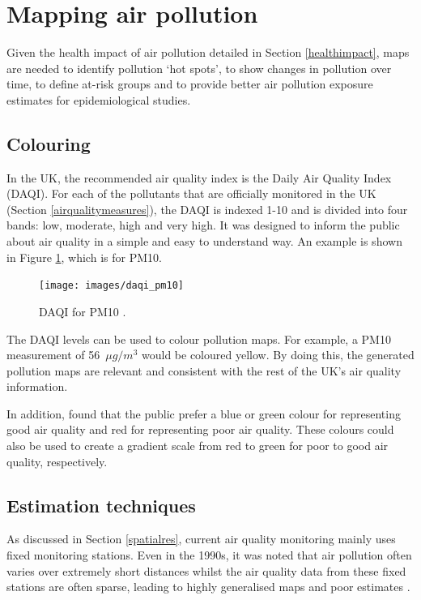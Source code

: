 \documentclass[11pt,twosided,a4paper]{report}
\begin{document}
\section{Mapping air pollution} \label{mappingpollution}

Given the health impact of air pollution detailed in Section \ref{healthimpact}, maps are needed to identify pollution `hot spots', to show changes in pollution over time, to define at-risk groups and to provide better air pollution exposure estimates for epidemiological studies.

\subsection{Colouring}

In the UK, the recommended air quality index is the Daily Air Quality Index (DAQI). For each of the pollutants that are officially monitored in the UK (Section \ref{airqualitymeasures}), the DAQI is indexed 1-10 and is divided into four bands: low, moderate, high and very high. It was designed to inform the public about air quality in a simple and easy to understand way. An example is shown in Figure \ref{fig:daqi_pm10}, which is for PM10.

\begin{figure}[!htb]
\centering
\texttt{[image: images/daqi\_pm10]}
\caption{DAQI for PM10 \citep{defra2018daqi}.}
\label{fig:daqi_pm10}
\end{figure}

The DAQI levels can be used to colour pollution maps. For example, a PM10 measurement of 56~$\mu g/m^3$ would be coloured yellow. By doing this, the generated pollution maps are relevant and consistent with the rest of the UK's air quality information.

In addition, \cite{smallbone2012customerinsight} found that the public prefer a blue or green colour for representing good air quality and red for representing poor air quality. These colours could also be used to create a gradient scale from red to green for poor to good air quality, respectively.

\subsection{Estimation techniques} \label{estimationtechniques}

As discussed in Section \ref{spatialres}, current air quality monitoring mainly uses fixed monitoring stations. Even in the 1990s, it was noted that air pollution often varies over extremely short distances whilst the air quality data from these fixed stations are often sparse, leading to highly generalised maps and poor estimates \citep{Briggs1997mappingGIS}.
\end{document}
